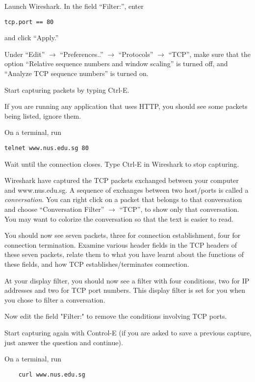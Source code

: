 \documentclass[a4paper,11pt]{exam}
\begin{document}
\begin{questions}

\question Launch Wireshark.  In the field ``Filter:'', enter 
\begin{verbatim}
tcp.port == 80
\end{verbatim}
and click ``Apply.''

Under ``Edit'' $\rightarrow$ ``Preferences..'' $\rightarrow$ ``Protocols'' $\rightarrow$ ``TCP'', make sure that the option ``Relative sequence numbers and window scaling'' is turned off, and ``Analyze TCP sequence numbers'' is turned on.  

Start capturing packets by typing Ctrl-E.

If you are running any application that uses HTTP, you should see some packets being listed, ignore them.

\question 
On a terminal, run 

\begin{verbatim}
telnet www.nus.edu.sg 80
\end{verbatim}

Wait until the connection closes.  Type Ctrl-E in Wireshark to stop capturing.

Wireshark have captured the TCP packets exchanged between your computer and www.nus.edu.sg.  A sequence of exchanges between two host/ports is called a \textit{conversation}.  You can right click on a packet that belongs to that conversation and choose ``Conversation Filter'' $\rightarrow$  ``TCP'', to show only that conversation.  You may want to colorize the conversation so that the text is easier to read. 

You should now see seven packets, three for connection establishment, four for connection termination.  Examine various header fields in the TCP headers of these seven packets, relate them to what you have learnt about the functions of these fields, and how TCP establishes/terminates connection.

\question 

At your display filter, you should now see a filter with four conditions, two for IP addresses and two for TCP port numbers.  This display filter is set for you when you chose to filter a conversation.

Now edit the field "Filter:" to remove the conditions involving TCP ports.

Start capturing again with Control-E (if you are asked to save a previous capture, just answer the question and continue).

On a terminal, run
\begin{verbatim}
	curl www.nus.edu.sg
\end{verbatim}


\end{questions}
\end{document}
